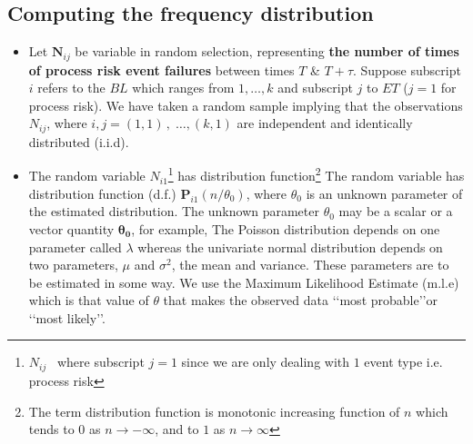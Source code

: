 \documentclass[]{DissertateUSU}
\let\rmarkdownfootnote\footnote%
\def\footnote{\protect\rmarkdownfootnote}
\begin{document}
\subsection{Computing the frequency distribution}

\begin{itemize}
\item Let $\mathbf{N}_{ij}$ be variable in random selection, representing \textbf{the number of times of process risk event failures} between times $T$ \& $T +\tau$. Suppose subscript $i$ refers to the $BL$ which ranges from \begin{math} 1, \ldots, k \end{math} and subscript $j$ to $ET$ ($j=1$ for process risk). We have taken a random sample implying that the observations \begin{math} N_{ij}\end{math}, {where} \begin{math}{i,j}= (1,1)\,,\;\ldots, (k,1)\end{math} are independent and identically distributed (i.i.d). 

\item The random variable $N_{i1}$\footnote{$N_{ij}$ \, where subscript $j=1$ since we are only dealing with $1$ event type i.e. process risk} has distribution function\footnote{The term distribution function is monotonic increasing function of $n$ which tends to $0$ as \begin{math} n \longrightarrow -\infty\end{math}, and to $1$ as \begin{math} n \longrightarrow \infty \end{math}} The random variable has distribution function (d.f.) \begin{math}\mathbf{P}_{i1}(n/\theta_0)  \end{math}, where $\theta_0$ is an unknown parameter of the estimated distribution.  The unknown parameter $\theta_0$ may be a scalar or a vector quantity \begin{math}\mathbf{\theta_0}\end{math}, for example, The Poisson distribution depends on one parameter called $\lambda$ whereas the univariate normal distribution depends on two parameters, $\mu$ and $\sigma ^2$, the mean and variance.  These parameters are to be estimated in some way. We use the Maximum Likelihood Estimate (m.l.e) which is that value of $\theta$ that makes the observed data \lq\lq most probable\rq\rq or \lq\lq most likely\rq\rq.\medskip


\end{itemize}
\end{document}
